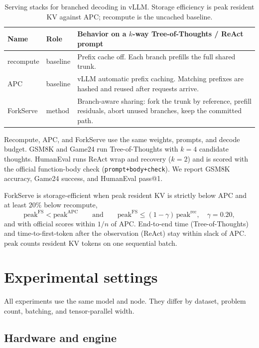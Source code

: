 \documentclass[11pt,a4paper]{article}
\begin{document}
\begin{table}[h]
\centering
\small
\begin{tabular}{@{}llp{}@{}}
\toprule
Name & Role & Behavior on a $k$-way Tree-of-Thoughts / ReAct prompt \\
\midrule
recompute & baseline & Prefix cache off. Each branch prefills the full shared trunk. \\
APC & baseline & vLLM automatic prefix caching. Matching prefixes are hashed and reused after requests arrive. \\
ForkServe & method & Branch-aware sharing: fork the trunk by reference, prefill residuals, abort unused branches, keep the committed path. \\
\bottomrule
\end{tabular}
\caption{Serving stacks for branched decoding in vLLM.
Storage efficiency is peak resident KV against APC; recompute is the uncached baseline.}
\end{table}

Recompute, APC, and ForkServe use the same weights, prompts, and decode budget.
GSM8K and Game24 run Tree-of-Thoughts with $k{=}4$ candidate thoughts.
HumanEval runs ReAct wrap and recovery ($k{=}2$) and is scored with the official function-body check (\texttt{prompt+body+check}).
We report GSM8K accuracy, Game24 success, and HumanEval pass@1.

ForkServe is storage-efficient when peak resident KV is strictly below APC and at least $20\%$ below recompute,
\begin{equation}
\label{eq:goal}
\mathrm{peak}^{\mathrm{FS}}
  < \mathrm{peak}^{\mathrm{APC}}
\qquad\text{and}\qquad
\mathrm{peak}^{\mathrm{FS}}
  \le (1-\gamma)\,\mathrm{peak}^{\mathrm{rec}},
\quad \gamma{=}0.20,
\end{equation}
and with official scores within $1/n$ of APC.
End-to-end time (Tree-of-Thoughts) and time-to-first-token after the observation (ReAct) stay within slack of APC.
$\mathrm{peak}$ counts resident KV tokens on one sequential batch.

\section{Experimental settings}

All experiments use the same model and node.
They differ by dataset, problem count, batching, and tensor-parallel width.

\subsection{Hardware and engine}
\end{document}
